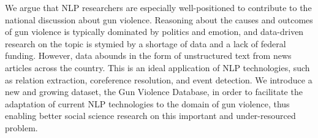 We argue that NLP researchers are especially well-positioned to contribute to the national discussion about gun violence. Reasoning about the causes and outcomes of gun violence is typically dominated by politics and emotion, and data-driven research on the topic is stymied by a shortage of data and a lack of federal funding. However, data abounds in the  form of unstructured text from news articles across the country. This is an ideal application of NLP technologies, such as relation extraction, coreference resolution, and event detection. We introduce a new and growing dataset, the Gun Violence Database, in order to facilitate the adaptation of current NLP technologies to the domain of gun violence, thus enabling better social science research on this important and under-resourced problem.
